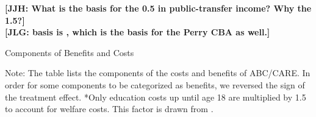 \noindent \textbf{[JJH: What is the basis for the 0.5 in public-transfer income? Why the 1.5?]} \\
\noindent \textbf{[JLG: basis is \citet{Browning_1987_AER,Heckman_Smith_1998_evaluating,Heckman_LaLonde_etal_1999_active,Feldstein_1999_REStat}, which is the basis for the Perry CBA as well.]}

\begin{table}[H]
\begin{threeparttable}
\caption{Components of Benefits and Costs}
\label{table:bc_comp}
\centering

\begin{tablenotes}
\tiny
\item Note: The table lists the components of the costs and benefits of ABC/CARE.
In order for some components to be categorized as benefits, we reversed the sign
of the treatment effect. *Only education costs up until age 18 are multiplied by 1.5 to account for welfare costs. This factor is drawn from \citet{Heckman_Moon_etal_2010_RateofReturn}.
\end{tablenotes}
\end{threeparttable}
\end{table}






